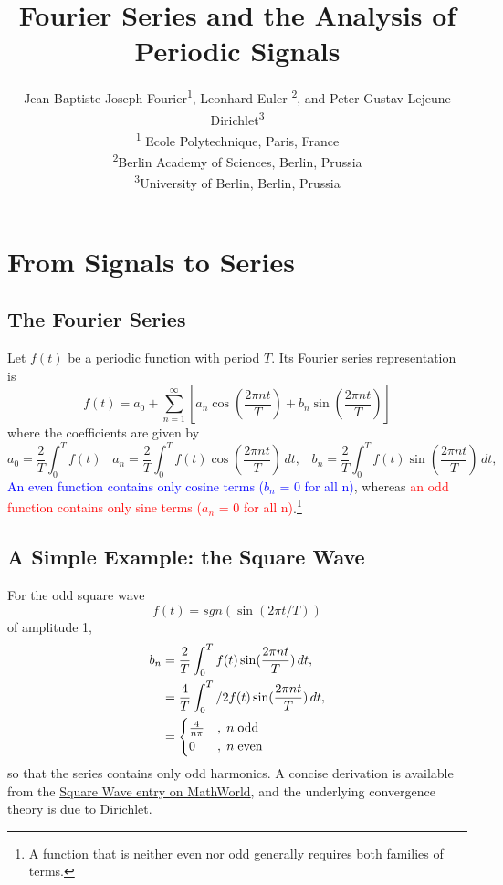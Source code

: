 \documentclass[a4paper,11pt]{article}
\title{\textbf{Fourier Series and the Analysis of Periodic Signals}}
\author{%
 Jean-Baptiste Joseph Fourier\textsuperscript{1}, Leonhard Euler \textsuperscript{2}, and Peter Gustav Lejeune Dirichlet\textsuperscript{3} \\
  \small
  \textsuperscript{1} Ecole Polytechnique, Paris, France\\
\textsuperscript{2}Berlin Academy of Sciences, Berlin, Prussia\\
\textsuperscript{3}University of Berlin, Berlin, Prussia
}
\date{}
\begin{document}
\maketitle
\section{ From Signals to Series}
\subsection{The Fourier Series}
Let $f(t)$ be a periodic function with period $T$. Its Fourier series representation is
\begin{equation}
    f(t)=a_0+\sum_{n=1}^\infty \left[ a_n \cos(\frac{2\pi nt}{T}) + b_n \sin(\frac{2\pi nt}{T})  \right]
    \label{eq:1}
\end{equation}
where the coefficients are given by
\begin{equation}
    a_0=\frac{2}{T}\int _0 ^T f(t) \hspace{10pt}
     a_n=\frac{2}{T}\int _0 ^T f(t) \cos(\frac{2\pi nt}{T})\,dt ,\hspace{10pt}
      b_n=\frac{2}{T}\int _0 ^T f(t) \sin(\frac{2\pi nt}{T})\,dt ,
\end{equation}
\textcolor{blue}{An even function contains only cosine terms ($b_n$ = 0 for all n)}, whereas \textcolor{red}{an odd function contains
only sine terms ($a_n$ = 0 for all n)}.\footnote{A function that is neither even nor odd generally requires both families of terms.}
\subsection{ A Simple Example: the Square Wave}
For the odd square wave $$f(t) = sgn(\sin(2\pi t/T))$$ of amplitude 1,
\begin{align}
    b_n &= \frac{2}{T}\int _0 ^T f(t) \sin(\frac{2\pi nt}{T})\,dt , \notag  \\ 
    &=\frac{4}{T}\int _0 ^T/2 f(t) \sin(\frac{2\pi nt}{T})\,dt , \notag \\
    &= 
    \begin{cases} 
        \frac{4}{n\pi} & , \; n\; \text{odd} \\
        0& , \; n\; \text{even}
    \end{cases}
    \label{eq:three}
\end{align}
so that the series contains only odd harmonics. A concise derivation is available from the \href{https://mathworld.wolfram.com/FourierSeriesSquareWave.html}{Square
Wave entry on MathWorld}, and the underlying convergence theory is due to Dirichlet.\cite{dirichlet1829} 
\newpage
\end{document}
